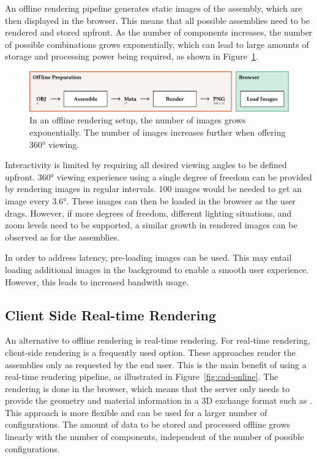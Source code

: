 An offline rendering pipeline generates static images of the assembly, which are then displayed in the browser. This means that all possible assemblies need to be rendered and stored upfront. As the number of components increases, the number of possible combinations grows exponentially, which can lead to large amounts of storage and processing power being required, as shown in Figure~\ref{fig:cad-offline}.

\begin{figure}[H]
  \includegraphics[width=\columnwidth]{resources/cad-pipeline-offline.png}
  \caption{In an offline rendering setup, the number of images grows exponentially. The number of images increases further when offering 360° viewing.}
  \label{fig:cad-offline}
\end{figure}

Interactivity is limited by requiring all desired viewing angles to be defined upfront. 360° viewing experience using a single degree of freedom can be provided by rendering images in regular intervals. 100 images would be needed to get an image every 3.6°. These images can then be loaded in the browser as the user drags. However, if more degrees of freedom, different lighting situations, and zoom levels need to be supported, a similar growth in rendered images can be observed as for the assemblies.

In order to address latency, pre-loading images can be used. This may entail loading additional images in the background to enable a smooth user experience. However, this leads to increased bandwith usage.

\subsection*{Client Side Real-time Rendering}

An alternative to offline rendering is real-time rendering. For real-time rendering, client-side rendering is a frequently  used option. These approaches render the assemblies only as requested by the end user. This is the main benefit of using a real-time rendering pipeline, as illustrated in Figure~\ref{fig:cad-online}. The rendering is done in the browser, which means that the server only needs to provide the geometry and material information in a 3D exchange format such as . This approach is more flexible and can be used for a larger number of configurations. The amount of data to be stored and processed offline grows linearly with the number of components, independent of the number of possible configurations.

